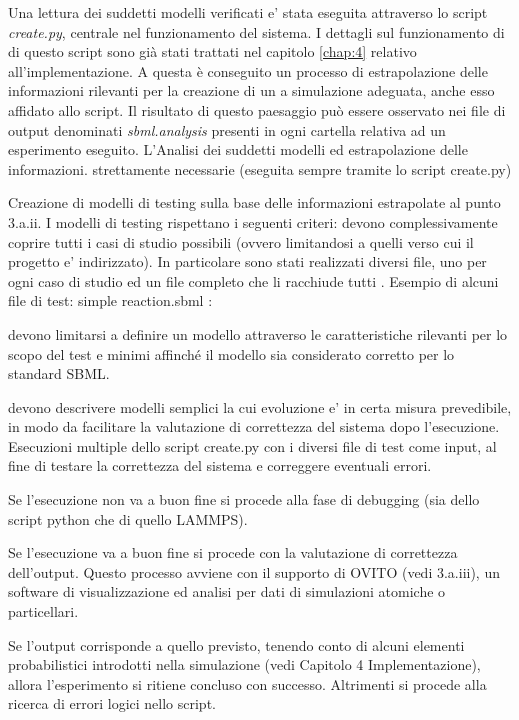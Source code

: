 \documentclass[Lau, oneside]{sapthesis}
\begin{document}
Una lettura dei suddetti modelli verificati e' stata eseguita attraverso lo script \textit{create.py}, centrale nel funzionamento del sistema. I dettagli sul funzionamento di di questo script sono già stati trattati nel capitolo \ref{chap:4} relativo all'implementazione. A questa \`e conseguito un processo di estrapolazione delle informazioni rilevanti per la creazione di un a simulazione adeguata, anche esso affidato allo script. Il risultato di questo paesaggio può essere osservato nei file di output denominati \textit{sbml.analysis} presenti in ogni cartella relativa ad un esperimento eseguito.
L'Analisi dei suddetti modelli ed estrapolazione delle informazioni. strettamente necessarie (eseguita sempre tramite lo script create.py)

Creazione di modelli di testing sulla base delle informazioni estrapolate al punto 3.a.ii. I modelli di testing rispettano i seguenti criteri:
devono complessivamente coprire tutti i casi di studio possibili (ovvero limitandosi a quelli verso cui il progetto e’ indirizzato).
In particolare sono stati realizzati diversi file, uno per ogni  caso di studio ed un file completo che li racchiude tutti . Esempio di alcuni file di test:
simple reaction.sbml :

devono limitarsi a definire un modello attraverso le caratteristiche rilevanti per lo scopo del test e minimi affinché il modello sia considerato corretto per lo standard SBML.

devono descrivere modelli semplici la cui evoluzione e’ in certa misura prevedibile, in modo da facilitare la valutazione di correttezza del sistema dopo l’esecuzione.
Esecuzioni multiple dello script create.py con i diversi file di test come input, al fine di testare la correttezza del sistema e correggere eventuali errori.

Se l'esecuzione non va a buon fine si procede alla fase di debugging (sia dello script python che di quello LAMMPS).

Se l’esecuzione va a buon fine si procede con la valutazione di correttezza dell’output.
Questo processo avviene con il supporto di OVITO (vedi 3.a.iii), un software di visualizzazione ed analisi per dati di simulazioni atomiche o particellari.

Se l’output corrisponde a quello previsto, tenendo conto di alcuni elementi probabilistici introdotti nella simulazione (vedi Capitolo 4 Implementazione), allora l’esperimento si ritiene concluso con successo.
Altrimenti si procede alla ricerca di errori logici nello script.
\end{document}
